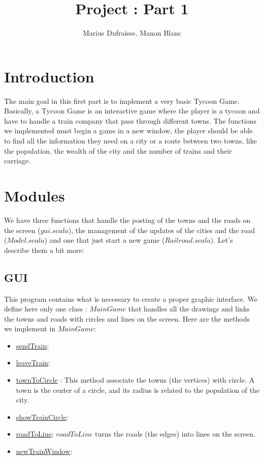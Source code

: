 \documentclass[a4paper]{article}
\title{Project : Part 1}
\author{Marius Dufraisse, Manon Blanc}
\date{ }
\begin{document}
	\maketitle
	\thispagestyle{fancy}
	\section{Introduction}
	
	The main goal in this first part is to implement a very basic Tycoon Game. Basically, a Tycoon Game is an interactive game where the player is a tycoon and have to handle a train company that pass through different towns. The functions we implemented must begin a game in a new window, the player should be able to find all the information they need on a city or a route between two towns, like the population, the wealth of the city and the number of trains and their carriage. 
	
	\section{Modules}
	
	We have three functions that handle the posting of the towns and the roads on the screen ($gui.scala$), the management of the updates of the cities and the road ($Model.scala$) and one that just start a new game ($Railroad.scala$). Let's describe them a bit more:
	
	\subsection{GUI}
	This program contains what is necessary to create a proper graphic interface. We define here only one class : $MainGame$ that handles all the drawings and links the towns and roads with circles and lines on the screen.
	Here are the methods we implement in $MainGame$:
	\begin{itemize}
		\item \underline{sendTrain}:
		
		\item \underline{leaveTrain}:
		
		\item \underline{townToCircle} : This method associate the towns (the vertices) with circle. A town is the center of a circle, and its radius is related to the population of the city.
		
		\item \underline{showTrainCircle}:
		
		\item \underline{roadToLine}: $roadToLine$ turns  the roads (the edges) into lines on the screen.
		
		\item \underline{newTrainWindow}:
		
	\end{itemize}
	
\end{document}
